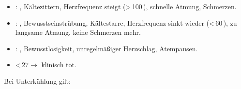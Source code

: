 \begin{itemize}
  \item {}: 
  \DegC*, Kältezittern,
  Herzfrequenz steigt ({\textgreater}\,100\,), schnelle Atmung, Schmerzen. 
  \item {}:
  \DegC*, Bewusstseinstrübung,
  Kältestarre, Herzfrequenz sinkt wieder ({\textless}\,60\,), zu langsame Atmung,
  keine Schmerzen mehr. 
  \item {}:
  \DegC*, Bewusstlosigkeit,
  unregelmäßiger Herzschlag, Atempausen.
  \item {\textless}\,27\DegC* ${\rightarrow}$ klinisch tot. 
\end{itemize}


% 



Bei Unterkühlung gilt:







\ChapterEnd